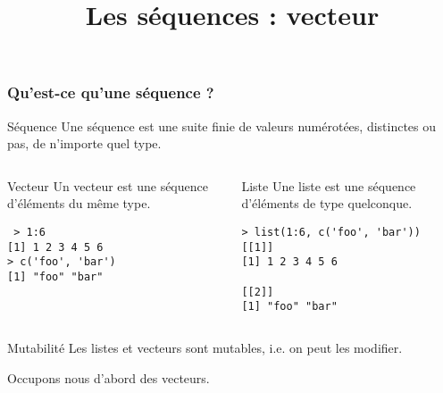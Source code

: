 \documentclass[10pt]{beamer}
\title{Les séquences : vecteur}
\begin{document}
\maketitle

\begin{frame}[fragile]
  \frametitle{Qu'est-ce qu'une séquence ?}

  \begin{alertblock}{Séquence}
    Une séquence est une suite finie de valeurs numérotées, distinctes ou pas, de n'importe quel type.   
  \end{alertblock}

 
\begin{columns}[t]
\begin{column}{0.48\textwidth}
 \begin{block}{Vecteur}
    Un vecteur est une séquence d'éléments \alert{du même type}.
    \begin{lstlisting}
 > 1:6
[1] 1 2 3 4 5 6
> c('foo', 'bar')
[1] "foo" "bar"     
    \end{lstlisting}
  \end{block}
\end{column}
\begin{column}{0.48\textwidth}
   \begin{block}{Liste}
     Une liste est une séquence d'éléments \alert{de type quelconque}.
     \begin{lstlisting}
> list(1:6, c('foo', 'bar'))
[[1]]
[1] 1 2 3 4 5 6

[[2]]
[1] "foo" "bar"       
     \end{lstlisting}
  \end{block}
\end{column}
\end{columns}

  \begin{block}{Mutabilité}
    Les listes et vecteurs sont mutables, i.e. on peut les modifier.    
  \end{block}

  \begin{center}
      Occupons nous d’abord des vecteurs.
  \end{center}

\end{frame}
\end{document}
